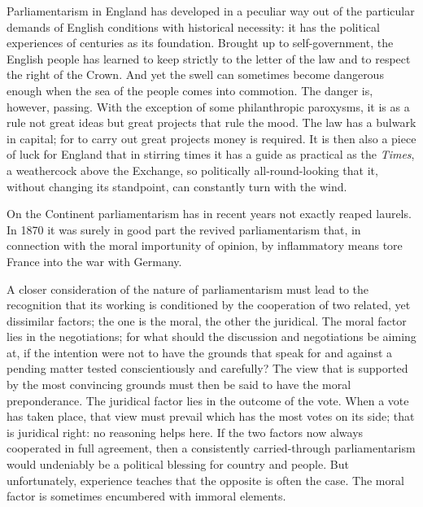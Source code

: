 \documentclass[12pt,a4paper,openany]{book}
\newcommand{\opage}[1]{\marginnote{\footnotesize\textit{[#1]}}}
\begin{document}
Parliamentarism in England has developed in a peculiar
way out of the particular demands of English conditions
with historical necessity: it has the political
experiences of centuries as its foundation. Brought up to self-government,
the English people has learned to keep strictly
to the letter of the law and to respect the right of the Crown. And yet
the swell can sometimes become dangerous enough when the sea of the people
comes into commotion. The danger is, however, passing. With
the exception of some philanthropic paroxysms, it is as a
rule not great ideas but great projects that rule
the mood. The law has a bulwark in capital; for
to carry out great projects money is required. It is then
also a piece of luck for England that in stirring times it
has a guide as practical as the \textit{Times}, a weathercock
above the Exchange, so politically all-round-looking that it, without
changing its standpoint, can constantly turn with the wind.

On the Continent parliamentarism has in recent
years not exactly reaped laurels. In 1870 it was surely
in good part the revived parliamentarism that,
\setcounter{footnote}{0}%
\opage{51}in connection with the moral importunity of opinion,
by inflammatory means tore France into the war with
Germany.

A closer consideration of the nature of parliamentarism
must lead to the recognition that its working
is conditioned by the cooperation of two related, yet dissimilar
factors; the one is the moral, the
other the juridical. The moral factor lies in
the negotiations; for what should the discussion and negotiations
be aiming at, if the intention were not
to have the grounds that speak for and against a pending
matter tested conscientiously and carefully? The
view that is supported by the most convincing grounds
must then be said to have the moral preponderance. The
juridical factor lies in the outcome of the vote. When
a vote has taken place, that view must prevail
which has the most votes on its side; that is
juridical right: no reasoning helps here. If
the two factors now always cooperated in full agreement,
then a consistently carried-through parliamentarism
would undeniably be a political blessing for country
and people. But unfortunately, experience teaches that the opposite
is often the case. The moral factor is sometimes
encumbered with immoral elements.
\end{document}
